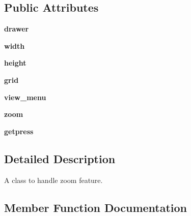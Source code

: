 \subsection*{Public Attributes}
\begin{DoxyCompactItemize}
\item 
\mbox{\label{classInterface_1_1myview_afc93ef26f814c927fdf9b1d71f3b5a2f}} 
{\bfseries drawer}
\item 
\mbox{\label{classInterface_1_1myview_a2dba7c149e862d3242b13eb1bd610b20}} 
{\bfseries width}
\item 
\mbox{\label{classInterface_1_1myview_a643f1e0f19451723fb0cb7b29147a8f1}} 
{\bfseries height}
\item 
\mbox{\label{classInterface_1_1myview_a90544f1d49eb1beaa744c0913c2a0e6c}} 
{\bfseries grid}
\item 
\mbox{\label{classInterface_1_1myview_aa519fcc7ff5ec7b7c242f583f3f3f11b}} 
{\bfseries view\+\_\+menu}
\item 
\mbox{\label{classInterface_1_1myview_aad5792790c6f28d2a4b6f2339d8d9ed0}} 
{\bfseries zoom}
\item 
\mbox{\label{classInterface_1_1myview_a4b3698fb04aae98a4298a8425eae661c}} 
{\bfseries getpress}
\end{DoxyCompactItemize}


\subsection{Detailed Description}
A class to handle zoom feature. 

\subsection{Member Function Documentation}
\mbox{\label{classInterface_1_1myview_a63712be7f2a54a99fe62bfaaf7e77c67}} 
